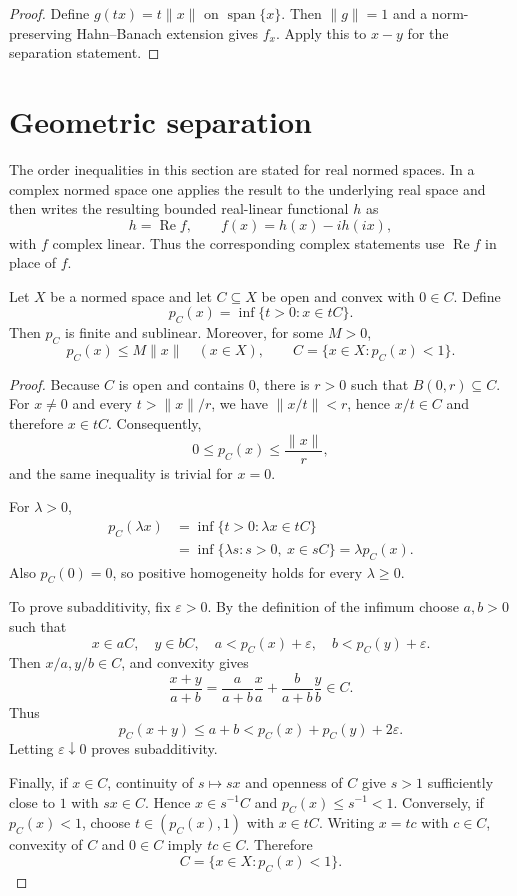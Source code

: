 \begin{proof}
Define $g(tx)=t\|x\|$ on $\operatorname{span}\{x\}$.  Then $\|g\|=1$ and a
norm-preserving Hahn--Banach extension gives $f_x$.  Apply this to $x-y$ for
the separation statement.
\end{proof}

\section{Geometric separation}

The order inequalities in this section are stated for real normed spaces.  In
a complex normed space one applies the result to the underlying real space and
then writes the resulting bounded real-linear functional $h$ as
\[
  h=\operatorname{Re}f,
  \qquad
  f(x)=h(x)-ih(ix),
\]
with $f$ complex linear.  Thus the corresponding complex statements use
$\operatorname{Re}f$ in place of $f$.

\begin{notelemma}
Let $X$ be a normed space and let $C\subseteq X$ be open and convex with
$0\in C$.  Define
\[
  p_C(x)=\inf\{t>0:x\in tC\}.
\]
Then $p_C$ is finite and sublinear.  Moreover, for some $M>0$,
\[
  p_C(x)\le M\|x\|\quad(x\in X),
  \qquad
  C=\{x\in X:p_C(x)<1\}.
\]
\end{notelemma}

\begin{proof}
Because $C$ is open and contains $0$, there is $r>0$ such that
$B(0,r)\subseteq C$.  For $x\ne0$ and every $t>\|x\|/r$, we have
$\|x/t\|<r$, hence $x/t\in C$ and therefore $x\in tC$.  Consequently,
\[
  0\le p_C(x)\le \frac{\|x\|}{r},
\]
and the same inequality is trivial for $x=0$.

For $\lambda>0$,
\[
\begin{aligned}
  p_C(\lambda x)
   &=\inf\{t>0:\lambda x\in tC\}\\
   &=\inf\{\lambda s:s>0,\ x\in sC\}
    =\lambda p_C(x).
\end{aligned}
\]
Also $p_C(0)=0$, so positive homogeneity holds for every $\lambda\ge0$.

To prove subadditivity, fix $\varepsilon>0$.  By the definition of the
infimum choose $a,b>0$ such that
\[
  x\in aC,\quad y\in bC,\quad
  a<p_C(x)+\varepsilon,\quad b<p_C(y)+\varepsilon.
\]
Then $x/a,y/b\in C$, and convexity gives
\[
  \frac{x+y}{a+b}
   =\frac{a}{a+b}\frac{x}{a}
    +\frac{b}{a+b}\frac{y}{b}\in C.
\]
Thus
\[
  p_C(x+y)\le a+b
  <p_C(x)+p_C(y)+2\varepsilon.
\]
Letting $\varepsilon\downarrow0$ proves subadditivity.

Finally, if $x\in C$, continuity of $s\mapsto sx$ and openness of $C$ give
$s>1$ sufficiently close to $1$ with $sx\in C$.  Hence
$x\in s^{-1}C$ and $p_C(x)\le s^{-1}<1$.  Conversely, if $p_C(x)<1$, choose
$t\in(p_C(x),1)$ with $x\in tC$.  Writing $x=tc$ with $c\in C$, convexity
of $C$ and $0\in C$ imply $tc\in C$.  Therefore
\[
  C=\{x\in X:p_C(x)<1\}.
\]
\end{proof}


